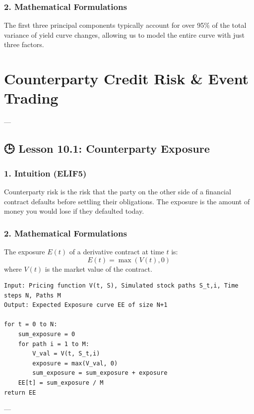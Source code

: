 \documentclass[11pt,oneside]{book}
\begin{document}
\subsection{2. Mathematical Formulations}
The first three principal components typically account for over 95\% of the total variance of yield curve changes, allowing us to model the entire curve with just three factors.


\newpage

\chapter{Counterparty Credit Risk & Event Trading}

---

\section{🕒 Lesson 10.1: Counterparty Exposure}

\subsection{1. Intuition (ELIF5)}
Counterparty risk is the risk that the party on the other side of a financial contract defaults before settling their obligations. The exposure is the amount of money you would lose if they defaulted today.

\subsection{2. Mathematical Formulations}
The exposure $E(t)$ of a derivative contract at time $t$ is:
$$E(t) = \max(V(t), 0)$$
where $V(t)$ is the market value of the contract.

\begin{tcolorbox}[colback=white,colframe=black,boxrule=0.6pt,arc=0mm,title=Expected Exposure Monte Carlo]
\begin{verbatim}
Input: Pricing function V(t, S), Simulated stock paths S_t,i, Time steps N, Paths M
Output: Expected Exposure curve EE of size N+1

for t = 0 to N:
    sum_exposure = 0
    for path i = 1 to M:
        V_val = V(t, S_t,i)
        exposure = max(V_val, 0)
        sum_exposure = sum_exposure + exposure
    EE[t] = sum_exposure / M
return EE
\end{verbatim}
\end{tcolorbox}

---
\end{document}
